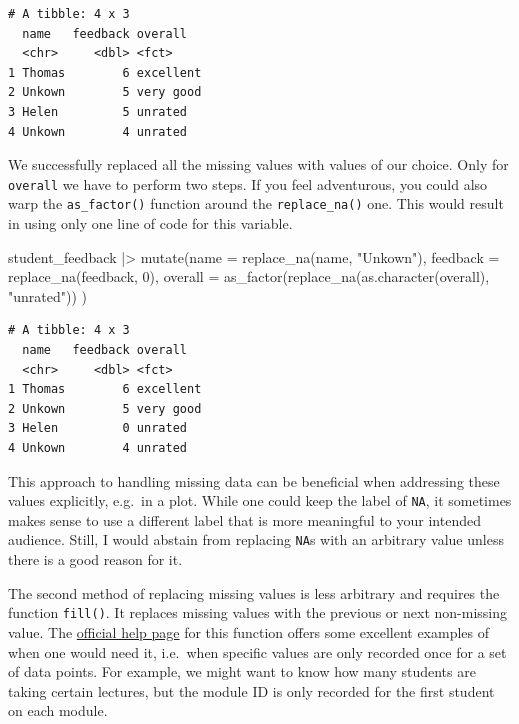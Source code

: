 \documentclass[
  letterpaper,
  DIV=11,
  numbers=noendperiod]{scrreprt}
\newenvironment{Shaded}{\begin{snugshade}}{\end{snugshade}}
\newcommand{\AttributeTok}[1]{\textcolor[rgb]{0.40,0.45,0.13}{#1}}
\newcommand{\DecValTok}[1]{\textcolor[rgb]{0.68,0.00,0.00}{#1}}
\newcommand{\FunctionTok}[1]{\textcolor[rgb]{0.28,0.35,0.67}{#1}}
\newcommand{\NormalTok}[1]{\textcolor[rgb]{0.00,0.23,0.31}{#1}}
\newcommand{\SpecialCharTok}[1]{\textcolor[rgb]{0.37,0.37,0.37}{#1}}
\newcommand{\StringTok}[1]{\textcolor[rgb]{0.13,0.47,0.30}{#1}}
\begin{document}
\begin{verbatim}
# A tibble: 4 x 3
  name   feedback overall  
  <chr>     <dbl> <fct>    
1 Thomas        6 excellent
2 Unkown        5 very good
3 Helen         5 unrated  
4 Unkown        4 unrated  
\end{verbatim}

We successfully replaced all the missing values with values of our
choice. Only for \texttt{overall} we have to perform two steps. If you
feel adventurous, you could also warp the \texttt{as\_factor()} function
around the \texttt{replace\_na()} one. This would result in using only
one line of code for this variable.

\begin{Shaded}
\begin{Highlighting}[]
\NormalTok{student\_feedback }\SpecialCharTok{|\textgreater{}}
  \FunctionTok{mutate}\NormalTok{(}\AttributeTok{name =} \FunctionTok{replace\_na}\NormalTok{(name, }\StringTok{"Unkown"}\NormalTok{),}
         \AttributeTok{feedback =} \FunctionTok{replace\_na}\NormalTok{(feedback, }\DecValTok{0}\NormalTok{),}
         \AttributeTok{overall =} \FunctionTok{as\_factor}\NormalTok{(}\FunctionTok{replace\_na}\NormalTok{(}\FunctionTok{as.character}\NormalTok{(overall),}
                                        \StringTok{"unrated"}\NormalTok{))}
\NormalTok{         )}
\end{Highlighting}
\end{Shaded}

\begin{verbatim}
# A tibble: 4 x 3
  name   feedback overall  
  <chr>     <dbl> <fct>    
1 Thomas        6 excellent
2 Unkown        5 very good
3 Helen         0 unrated  
4 Unkown        4 unrated  
\end{verbatim}

This approach to handling missing data can be beneficial when addressing
these values explicitly, e.g.~in a plot. While one could keep the label
of \texttt{NA}, it sometimes makes sense to use a different label that
is more meaningful to your intended audience. Still, I would abstain
from replacing \texttt{NA}s with an arbitrary value unless there is a
good reason for it.

The second method of replacing missing values is less arbitrary and
requires the function \texttt{fill()}. It replaces missing values with
the previous or next non-missing value. The
\href{https://tidyr.tidyverse.org/reference/fill.html}{official help
page} for this function offers some excellent examples of when one would
need it, i.e.~when specific values are only recorded once for a set of
data points. For example, we might want to know how many students are
taking certain lectures, but the module ID is only recorded for the
first student on each module.
\end{document}
